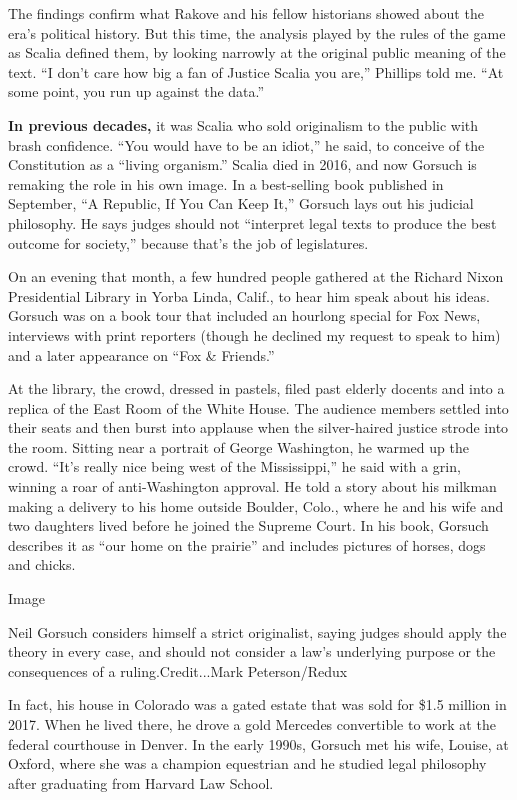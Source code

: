 The findings confirm what Rakove and his fellow historians showed about
the era's political history. But this time, the analysis played by the
rules of the game as Scalia defined them, by looking narrowly at the
original public meaning of the text. ``I don't care how big a fan of
Justice Scalia you are,'' Phillips told me. ``At some point, you run up
against the data.''

\textbf{In previous decades,} it was Scalia who sold originalism to the
public with brash confidence. ``You would have to be an idiot,'' he
said, to conceive of the Constitution as a ``living organism.'' Scalia
died in 2016, and now Gorsuch is remaking the role in his own image. In
a best-selling book published in September, ``A Republic, If You Can
Keep It,'' Gorsuch lays out his judicial philosophy. He says judges
should not ``interpret legal texts to produce the best outcome for
society,'' because that's the job of legislatures.

On an evening that month, a few hundred people gathered at the Richard
Nixon Presidential Library in Yorba Linda, Calif., to hear him speak
about his ideas. Gorsuch was on a book tour that included an hourlong
special for Fox News, interviews with print reporters (though he
declined my request to speak to him) and a later appearance on ``Fox \&
Friends.''

At the library, the crowd, dressed in pastels, filed past elderly
docents and into a replica of the East Room of the White House. The
audience members settled into their seats and then burst into applause
when the silver-haired justice strode into the room. Sitting near a
portrait of George Washington, he warmed up the crowd. ``It's really
nice being west of the Mississippi,'' he said with a grin, winning a
roar of anti-Washington approval. He told a story about his milkman
making a delivery to his home outside Boulder, Colo., where he and his
wife and two daughters lived before he joined the Supreme Court. In his
book, Gorsuch describes it as ``our home on the prairie'' and includes
pictures of horses, dogs and chicks.

Image

Neil Gorsuch considers himself a strict originalist, saying judges
should apply the theory in every case, and should not consider a law's
underlying purpose or the consequences of a ruling.Credit...Mark
Peterson/Redux

In fact, his house in Colorado was a gated estate that was sold for
\$1.5 million in 2017. When he lived there, he drove a gold Mercedes
convertible to work at the federal courthouse in Denver. In the early
1990s, Gorsuch met his wife, Louise, at Oxford, where she was a champion
equestrian and he studied legal philosophy after graduating from Harvard
Law School.

